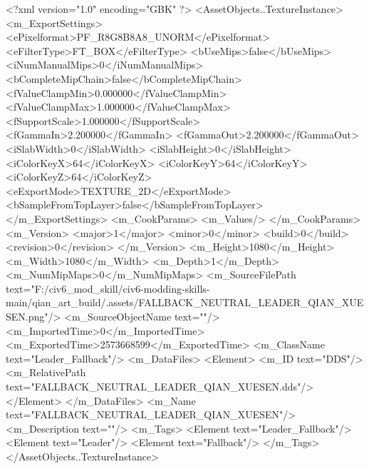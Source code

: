 <?xml version="1.0" encoding="GBK" ?>
<AssetObjects..TextureInstance>
	<m_ExportSettings>
		<ePixelformat>PF_R8G8B8A8_UNORM</ePixelformat>
		<eFilterType>FT_BOX</eFilterType>
		<bUseMips>false</bUseMips>
		<iNumManualMips>0</iNumManualMips>
		<bCompleteMipChain>false</bCompleteMipChain>
		<fValueClampMin>0.000000</fValueClampMin>
		<fValueClampMax>1.000000</fValueClampMax>
		<fSupportScale>1.000000</fSupportScale>
		<fGammaIn>2.200000</fGammaIn>
		<fGammaOut>2.200000</fGammaOut>
		<iSlabWidth>0</iSlabWidth>
		<iSlabHeight>0</iSlabHeight>
		<iColorKeyX>64</iColorKeyX>
		<iColorKeyY>64</iColorKeyY>
		<iColorKeyZ>64</iColorKeyZ>
		<eExportMode>TEXTURE_2D</eExportMode>
		<bSampleFromTopLayer>false</bSampleFromTopLayer>
	</m_ExportSettings>
	<m_CookParams>
		<m_Values/>
	</m_CookParams>
	<m_Version>
		<major>1</major>
		<minor>0</minor>
		<build>0</build>
		<revision>0</revision>
	</m_Version>
	<m_Height>1080</m_Height>
	<m_Width>1080</m_Width>
	<m_Depth>1</m_Depth>
	<m_NumMipMaps>0</m_NumMipMaps>
	<m_SourceFilePath text="F:/civ6_mod_skill/civ6-modding-skills-main/qian_art_build/.assets/FALLBACK_NEUTRAL_LEADER_QIAN_XUESEN.png"/>
	<m_SourceObjectName text=""/>
	<m_ImportedTime>0</m_ImportedTime>
	<m_ExportedTime>2573668599</m_ExportedTime>
	<m_ClassName text="Leader_Fallback"/>
	<m_DataFiles>
		<Element>
			<m_ID text="DDS"/>
			<m_RelativePath text="FALLBACK_NEUTRAL_LEADER_QIAN_XUESEN.dds"/>
		</Element>
	</m_DataFiles>
	<m_Name text="FALLBACK_NEUTRAL_LEADER_QIAN_XUESEN"/>
	<m_Description text=""/>
	<m_Tags>
		<Element text="Leader_Fallback"/>
		<Element text="Leader"/>
		<Element text="Fallback"/>
	</m_Tags>
</AssetObjects..TextureInstance>
